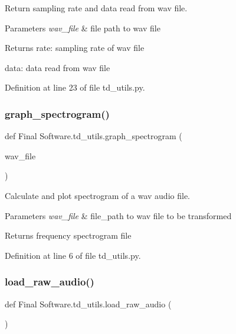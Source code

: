 Return sampling rate and data read from wav file. 


\begin{DoxyParams}{Parameters}
{\em wav\+\_\+file} & file path to wav file \\
\hline
\end{DoxyParams}
\begin{DoxyReturn}{Returns}
rate\+: sampling rate of wav file 

data\+: data read from wav file 
\end{DoxyReturn}


Definition at line 23 of file td\+\_\+utils.\+py.

\mbox{\label{namespace_final_01_software_1_1td__utils_a80a9b7080af7f78cf8fd151a6537b11f}} 
\subsubsection{graph\_spectrogram()}
{\footnotesize\ttfamily def Final Software.\+td\+\_\+utils.\+graph\+\_\+spectrogram (\begin{DoxyParamCaption}\item[{}]{wav\+\_\+file }\end{DoxyParamCaption})}



Calculate and plot spectrogram of a wav audio file. 


\begin{DoxyParams}{Parameters}
{\em wav\+\_\+file} & file\+\_\+path to wav file to be transformed \\
\hline
\end{DoxyParams}
\begin{DoxyReturn}{Returns}
frequency spectrogram file 
\end{DoxyReturn}


Definition at line 6 of file td\+\_\+utils.\+py.

\mbox{\label{namespace_final_01_software_1_1td__utils_a33be328f54eaa05f085e08d6de195b39}} 
\subsubsection{load\_raw\_audio()}
{\footnotesize\ttfamily def Final Software.\+td\+\_\+utils.\+load\+\_\+raw\+\_\+audio (\begin{DoxyParamCaption}{ }\end{DoxyParamCaption})}



